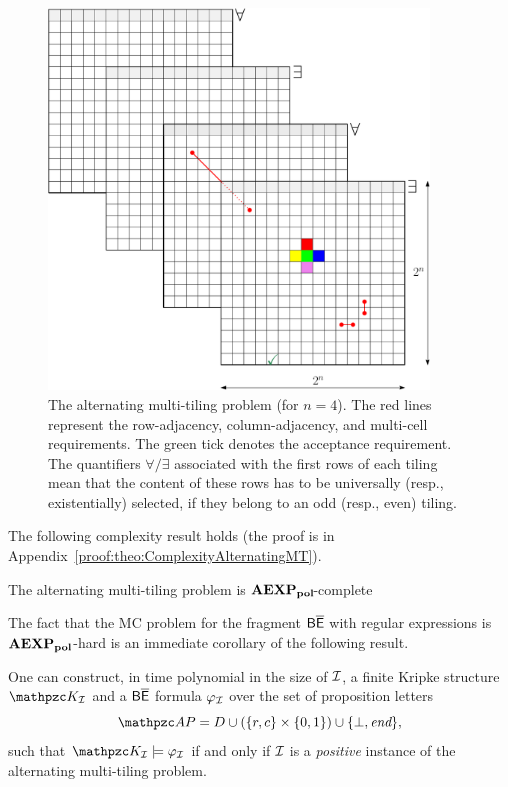 \begin{figure}[p]
\centering
    \includegraphics[width=0.9\textwidth]{Chaps/Gandalf17RIVISTA/tiling-crop.pdf}
\caption{The alternating multi-tiling problem (for $n=4$).
The red lines represent the row-adjacency,  column-adjacency, and multi-cell requirements. The green tick denotes the acceptance requirement.
The quantifiers $\forall/\exists$ associated with  the first rows of each tiling mean that the content of these rows has to be universally (resp., existentially) selected, if they belong to an odd (resp., even) tiling.}\label{fig:altmultitil}
\end{figure}

The following complexity result holds (the proof is in Appendix~\ref{proof:theo:ComplexityAlternatingMT}).
\begin{theorem}\label{theo:ComplexityAlternatingMT} The alternating multi-tiling problem is $\mathbf{AEXP_{pol}}\!$-complete
\end{theorem}

The fact that the MC problem for the fragment $\mathsf{B\overline{E}}$ with regular expressions is $\mathbf{AEXP_{pol}}$-hard is an immediate corollary of the following result.

\begin{theorem}\label{theo:MainLowerBoundResult}
One can construct, in time polynomial in the size of $\mathcal{I}$, a finite Kripke structure $\Ku_\Instance$ and a $\mathsf{B\overline{E}}$ formula
$\varphi_{\mathcal{I}}$ over the set of proposition letters \[\Prop = D \cup (\{r,c\}\times \{0,1\}) \cup \{\bot,\End\},\]
such that  
$\Ku_\Instance\models \varphi_\Instance$ if and only if $\mathcal{I}$ is a \emph{positive} instance of the alternating multi-tiling problem.
\end{theorem}


